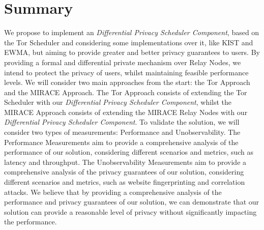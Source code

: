 
\section{Summary}\label{sec:elaboration_summary}

We propose to implement an \textit{Differential Privacy Scheduler Component}, based on the Tor Scheduler and considering some implementations over it, like KIST and EWMA, but aiming to provide greater and better privacy guarantees to users. By providing a formal and differential private mechanism over Relay Nodes, we intend to protect the privacy of users, whilst maintaining feasible performance levels. We will consider two main approaches from the start: the Tor Approach and the MIRACE Approach. The Tor Approach consists of extending the Tor Scheduler with our \textit{Differential Privacy Scheduler Component}, whilst the MIRACE Approach consists of extending the MIRACE Relay Nodes with our \textit{Differential Privacy Scheduler Component}. To validate the solution, we will consider two types of measurements: Performance and Unobservability. The Performance Measurements aim to provide a comprehensive analysis of the performance of our solution, considering different scenarios and metrics, such as latency and throughput. The Unobservability Measurements aim to provide a comprehensive analysis of the privacy guarantees of our solution, considering different scenarios and metrics, such as website fingerprinting and correlation attacks. We believe that by providing a comprehensive analysis of the performance and privacy guarantees of our solution, we can demonstrate that our solution can provide a reasonable level of privacy without significantly impacting the performance.
